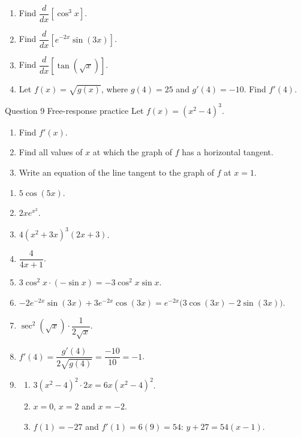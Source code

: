 \documentclass[11pt]{article}
\begin{document}
\begin{enumerate}[leftmargin=*,itemsep=2pt,start=5]
  \item Find $\dfrac{d}{dx}\left[\cos^3x\right]$.\work{2.8cm}
  \item Find $\dfrac{d}{dx}\left[e^{-2x}\sin(3x)\right]$.\work{2.8cm}
  \item Find $\dfrac{d}{dx}\left[\tan\!\left(\sqrt{x}\right)\right]$.\work{2.8cm}
  \item Let $f(x)=\sqrt{g(x)}$, where $g(4)=25$ and $g'(4)=-10$. Find $f'(4)$.\work{2.8cm}
\end{enumerate}

\begin{frbox}{Question 9 \textperiodcentered{} Free-response practice}
Let $f(x)=\left(x^2-4\right)^3$.
\begin{enumerate}[label=(\alph*),leftmargin=*,itemsep=2pt]
  \item Find $f'(x)$.\work{2.6cm}
  \item Find all values of $x$ at which the graph of $f$ has a horizontal tangent.\work{2.6cm}
  \item Write an equation of the line tangent to the graph of $f$ at $x=1$.\work{2.6cm}
\end{enumerate}
\end{frbox}

\newpage
\begin{solbox}
\begin{enumerate}[leftmargin=*,itemsep=4pt]
  \item $5\cos(5x)$.
  \item $2xe^{x^2}$.
  \item $4\left(x^2+3x\right)^3(2x+3)$.
  \item $\dfrac{4}{4x+1}$.
  \item $3\cos^2x\cdot(-\sin x)=-3\cos^2x\sin x$.
  \item $-2e^{-2x}\sin(3x)+3e^{-2x}\cos(3x)=e^{-2x}\big(3\cos(3x)-2\sin(3x)\big)$.
  \item $\sec^2\!\left(\sqrt x\right)\cdot\dfrac{1}{2\sqrt x}$.
  \item $f'(4)=\dfrac{g'(4)}{2\sqrt{g(4)}}=\dfrac{-10}{10}=-1$.
  \item \begin{enumerate}[label=(\alph*),leftmargin=*,itemsep=3pt]
    \item $3\left(x^2-4\right)^2\cdot2x=6x\left(x^2-4\right)^2$.
    \item $x=0$, $x=2$ and $x=-2$.
    \item $f(1)=-27$ and $f'(1)=6(9)=54$: $y+27=54(x-1)$.
  \end{enumerate}
\end{enumerate}
\end{solbox}
\end{document}
